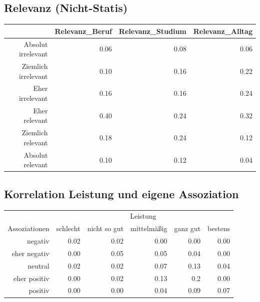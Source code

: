 \documentclass[12pt,a4paper,titlepage=true,parskip,ngerman]{scrartcl}
\begin{document}
\subsection{Relevanz (Nicht-Statis)}
\begin{table}[ht]
\begin{tabular}{rrrr}
  \hline
 & Relevanz\_Beruf & Relevanz\_Studium & Relevanz\_Alltag \\ 
  \hline
Absolut irrelevant & 0.06 & 0.08 & 0.06 \\ 
  Ziemlich irrelevant & 0.10 & 0.16 & 0.22 \\ 
  Eher irrelevant & 0.16 & 0.16 & 0.24 \\ 
  Eher relevant & 0.40 & 0.24 & 0.32 \\ 
  Ziemlich relevant & 0.18 & 0.24 & 0.12 \\ 
  Absolut relevant & 0.10 & 0.12 & 0.04 \\ 
   \hline
\end{tabular}
\end{table}

\subsection{Korrelation Leistung und eigene Assoziation}
\begin{table}[ht]
	\begin{tabular}{rrrrrr}
		\hline
		& \multicolumn{5}{c}{Leistung}\\
		Assoziationen & schlecht & nicht so gut & mittelmäßig & ganz gut & bestens\\
		\hline
		negativ &  0.02 & 0.02 & 0.00 & 0.00 & 0.00\\
		eher negativ & 0.00 &  0.05  & 0.05 & 0.04 & 0.00\\
		neutral  & 0.02  &  0.02 & 0.07 & 0.13  &  0.04\\
		eher positiv & 0.00 & 0.02 &  0.13  & 0.2  & 0.00\\
		positiv  &   0.00  &  0.00  & 0.04 & 0.09  &  0.07\\
		\hline
	\end{tabular}
\end{table}
\end{document}
